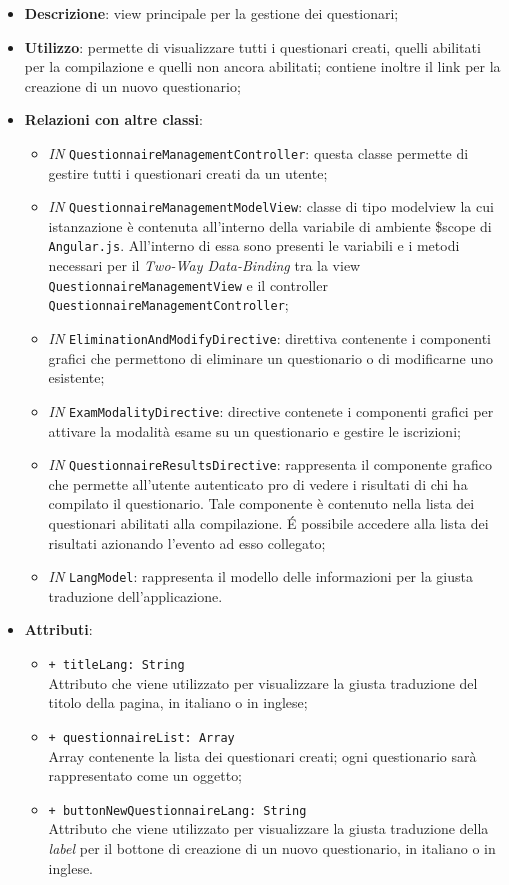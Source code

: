 \begin{itemize}
	\item \textbf{Descrizione}: view principale per la gestione dei questionari;
	\item \textbf{Utilizzo}: permette di visualizzare tutti i questionari creati, quelli abilitati per la compilazione e quelli non ancora abilitati; contiene inoltre il link per la creazione di un nuovo questionario;
	\item \textbf{Relazioni con altre classi}:
	\begin{itemize}
		\item \textit{IN} \texttt{QuestionnaireManagementController}: questa classe permette di gestire tutti i questionari creati da un utente;
		\item \textit{IN} \texttt{QuestionnaireManagementModelView}: classe di tipo modelview la cui istanzazione è contenuta all'interno della variabile di ambiente \$scope di \texttt{Angular.js}. All'interno di essa sono presenti le variabili e i metodi necessari per il \textit{Two-Way Data-Binding} tra la view \texttt{QuestionnaireManagementView} e il controller \texttt{QuestionnaireManagementController};
		\item \textit{IN} \texttt{EliminationAndModifyDirective}: direttiva contenente i componenti grafici  che permettono di eliminare un questionario o di modificarne uno esistente;
		\item \textit{IN} \texttt{ExamModalityDirective}: directive contenete i componenti grafici per attivare la modalità esame su un questionario e gestire le iscrizioni;
		\item \textit{IN} \texttt{QuestionnaireResultsDirective}: rappresenta il componente grafico che permette all'utente autenticato pro di vedere i risultati di chi ha compilato il questionario. Tale componente è contenuto nella lista dei questionari abilitati alla compilazione. \'E possibile accedere alla lista dei risultati azionando l'evento ad esso collegato;
		\item \textit{IN} \texttt{LangModel}: rappresenta il modello delle informazioni per la giusta traduzione dell'applicazione.
	\end{itemize}
		\item \textbf{Attributi}:
		\begin{itemize}
			\item \texttt{+ titleLang: String} \\ Attributo che viene utilizzato per visualizzare la giusta traduzione del titolo della pagina, in italiano o in inglese;
			\item \texttt{+ questionnaireList: Array} \\ Array contenente la lista dei questionari creati; ogni questionario sarà rappresentato come un oggetto;
			\item \texttt{+ buttonNewQuestionnaireLang: String} \\ Attributo che viene utilizzato per visualizzare la giusta traduzione della \textit{label} per il bottone di creazione di un nuovo questionario, in italiano o in inglese.
		\end{itemize}
\end{itemize}


